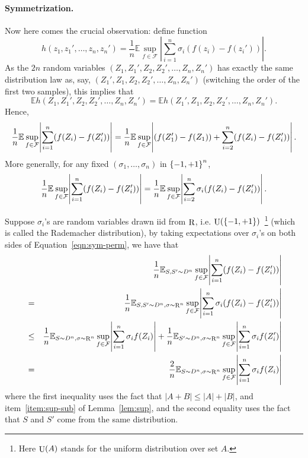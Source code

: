\documentclass{article}
\DeclareMathOperator*{\R}{{\rm R}}
\DeclareMathOperator*{\U}{{\rm U}}
\newcommand{\EE}{\mathbb{E}}
\newcommand{\Fcal}{\mathcal{F}}
\begin{document}
\paragraph{Symmetrization.} Now here comes the crucial observation: define function
\[ h(z_1, z_1',\ldots,z_n,z_n') = \frac{1}{n} \EE \sup_{f \in \Fcal} |\sum_{i=1}^n \sigma_i (f(z_i) - f(z_i'))|. \]
As the $2n$ random variables
$(Z_1,Z_1',Z_2,Z_2',\ldots,Z_n,Z_n')$ has exactly the same distribution law as, say, $(Z_1',Z_1,Z_2,Z_2',\ldots,Z_n,Z_n')$ (switching the order of the first two samples), this implies that
\[ \EE h(Z_1,Z_1',Z_2,Z_2',\ldots,Z_n,Z_n') = \EE h(Z_1',Z_1,Z_2,Z_2',\ldots,Z_n,Z_n'). \]
Hence,
\[
  \frac{1}{n} \EE \sup_{f \in \Fcal} \abs{\sum_{i=1}^n (f(Z_i) - f(Z_i'))}
   = \frac{1}{n} \EE \sup_{f \in \Fcal} \abs{(f(Z_1') - f(Z_1)) + \sum_{i=2}^n (f(Z_i) - f(Z_i'))}.
\]
More generally, for any fixed $(\sigma_1, \ldots, \sigma_n)$ in $\cbr{-1,+1}^n$,
\begin{equation}
  \frac{1}{n} \EE \sup_{f \in \Fcal} \abs{\sum_{i=1}^n (f(Z_i) - f(Z_i'))}
  = \frac{1}{n} \EE \sup_{f \in \Fcal} \abs{\sum_{i=2}^n \sigma_i (f(Z_i) - f(Z_i'))}.
  \label{eqn:sym-perm}
\end{equation}




Suppose $\sigma_i$'s are random variables drawn iid from $\R$, i.e. $\U(\cbr{-1,+1})$~\footnote{Here $\U(A)$ stands for the uniform distribution over set $A$.} (which is called the Rademacher distribution), by taking expectations over $\sigma_i$'s on both sides of Equation~\eqref{eqn:sym-perm}, we have that
\begin{eqnarray}
&& \frac{1}{n} \EE_{S, S' \sim D^n} \sup_{f \in \Fcal} \abs{\sum_{i=1}^n (f(Z_i) - f(Z_i'))} \nonumber \\
&=&
\frac{1}{n} \EE_{S, S' \sim D^n, \sigma \sim \R^n} \sup_{f \in \Fcal} \abs{\sum_{i=1}^n \sigma_i(f(Z_i) - f(Z_i'))} \nonumber \\
&\leq&
\frac{1}{n} \EE_{S \sim D^n, \sigma \sim \R^n} \sup_{f \in \Fcal} \abs{\sum_{i=1}^n \sigma_i f(Z_i)} + \frac{1}{n} \EE_{S' \sim D^n, \sigma \sim \R^n} \sup_{f \in \Fcal} \abs{\sum_{i=1}^n \sigma_i f(Z_i')} \nonumber \\
&=& \frac{2}{n} \EE_{S \sim D^n, \sigma \sim \R^n} \sup_{f \in \Fcal} \abs{\sum_{i=1}^n \sigma_i f(Z_i)} \label{eqn:sym}
\end{eqnarray}
where the first inequality uses the fact that $|A+B| \leq |A| + |B|$, and item~\ref{item:sup-sub} of Lemma~\ref{lem:sup}, and the second equality uses the fact that
$S$ and $S'$ come from the same distribution.
\end{document}

